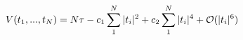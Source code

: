 \begin{equation}
V(t_1,..., t_N) = N\tau -  c_1 \sum_1^N |t_i|^2 +
c_2 \sum_1^N |t_i|^4  + {\cal{O}}(|t_i|^6)
\label{manypotential}
\end{equation}

